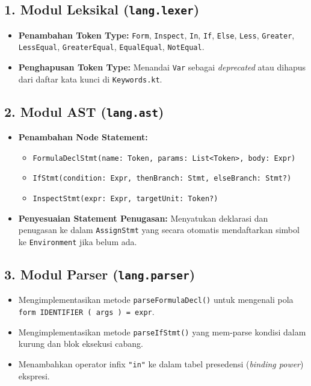 \documentclass[11pt,a4paper]{article}
\begin{document}
\subsection{1. Modul Leksikal (\texttt{lang.lexer})}
\begin{itemize}[noitemsep]
    \item \textbf{Penambahan Token Type:} \texttt{Form}, \texttt{Inspect}, \texttt{In}, \texttt{If}, \texttt{Else}, \texttt{Less}, \texttt{Greater}, \texttt{LessEqual}, \texttt{GreaterEqual}, \texttt{EqualEqual}, \texttt{NotEqual}.
    \item \textbf{Penghapusan Token Type:} Menandai \texttt{Var} sebagai \textit{deprecated} atau dihapus dari daftar kata kunci di \texttt{Keywords.kt}.
\end{itemize}

\subsection{2. Modul AST (\texttt{lang.ast})}
\begin{itemize}[noitemsep]
    \item \textbf{Penambahan Node Statement:}
    \begin{itemize}
        \item \texttt{FormulaDeclStmt(name: Token, params: List<Token>, body: Expr)}
        \item \texttt{IfStmt(condition: Expr, thenBranch: Stmt, elseBranch: Stmt?)}
        \item \texttt{InspectStmt(expr: Expr, targetUnit: Token?)}
    \end{itemize}
    \item \textbf{Penyesuaian Statement Penugasan:} Menyatukan deklarasi dan penugasan ke dalam \texttt{AssignStmt} yang secara otomatis mendaftarkan simbol ke \texttt{Environment} jika belum ada.
\end{itemize}

\subsection{3. Modul Parser (\texttt{lang.parser})}
\begin{itemize}[noitemsep]
    \item Mengimplementasikan metode \texttt{parseFormulaDecl()} untuk mengenali pola \texttt{form IDENTIFIER ( args ) = expr}.
    \item Mengimplementasikan metode \texttt{parseIfStmt()} yang mem-parse kondisi dalam kurung dan blok eksekusi cabang.
    \item Menambahkan operator infix \texttt{"in"} ke dalam tabel presedensi (\textit{binding power}) ekspresi.
\end{itemize}
\end{document}
